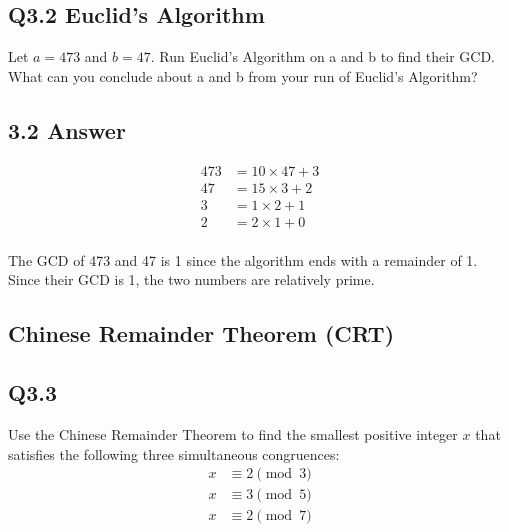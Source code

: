 \documentclass{article}
\begin{document}
\subsection*{Q3.2 Euclid's Algorithm}
Let $a = 473$ and $b = 47$. Run Euclid's Algorithm on a and b to find their GCD. What can you conclude about a and b from your run of Euclid's Algorithm?
\newpage
\subsection*{3.2 Answer}

\begin{align*}
473 &= 10 \times 47 + 3 \\
47 &= 15 \times 3 + 2 \\
3 &= 1 \times 2 + 1 \\
2 &= 2 \times 1 + 0 \\
\end{align*}

The GCD of 473 and 47 is 1 since the algorithm ends with a remainder of 1. Since their GCD is 1, the two numbers are relatively prime.
\newpage
\subsection*{Chinese Remainder Theorem (CRT)}
\subsection*{Q3.3}
Use the Chinese Remainder Theorem to find the smallest positive integer \( x \) that satisfies the following three simultaneous congruences:
\begin{align*}
x &\equiv 2 \pmod{3}\\  
x &\equiv 3 \pmod{5}\\
x &\equiv 2 \pmod{7}
\end{align*}
\newpage
\end{document}
